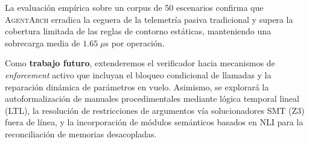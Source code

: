\documentclass[conference]{IEEEtran}
\begin{document}
La evaluaci\'on emp\'irica sobre un corpus de 50 escenarios confirma que \textsc{AgentArch} erradica la ceguera de la telemetr\'ia pasiva tradicional y supera la cobertura limitada de las reglas de contorno est\'aticas, manteniendo una sobrecarga media de $1.65\;\mu$s por operaci\'on.

Como \textbf{trabajo futuro}, extenderemos el verificador hacia mecanismos de \emph{enforcement} activo que incluyan el bloqueo condicional de llamadas y la reparaci\'on din\'amica de par\'ametros en vuelo. Asimismo, se explorar\'a la autoformalizaci\'on de manuales procedimentales mediante l\'ogica temporal lineal (LTL), la resoluci\'on de restricciones de argumentos v\'ia solucionadores SMT (Z3) fuera de l\'inea, y la incorporaci\'on de m\'odulos sem\'anticos basados en NLI para la reconciliaci\'on de memorias desacopladas.



\end{document}
